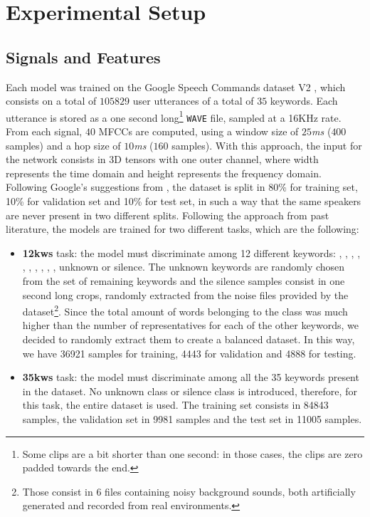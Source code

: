 \section{Experimental Setup}

\subsection{Signals and Features}
\label{sec:sig&features}


Each model was trained on the Google Speech Commands dataset V2 \cite{speechdataset2018warden}, which consists on a total of $105829$ user utterances of a total of $35$ keywords. Each utterance is stored as a one second long\footnote{Some clips are a bit shorter than one second: in those cases, the clips are zero padded towards the end.} \verb|WAVE| file, sampled at a 16KHz rate. From each signal, $40$ MFCCs are computed, using a window size of $25$\textit{ms} ($400$ samples) and a hop size of $10$\textit{ms} ($160$ samples). With this approach, the input for the network consists in 3D tensors with one outer channel, where width represents the time domain and height represents the frequency domain. Following Google's suggestions from \cite{speechdataset2018warden}, the dataset is split in 80\% for training set, 10\% for validation set and 10\% for test set, in such a way that the same speakers are never present in two different splits. 
Following the approach from past literature, the models are trained for two different tasks, which are the following:
\begin{itemize}
	\item \textbf{12kws} task: the model must discriminate among 12 different keywords: , , , , , , , , , , unknown or silence. The unknown keywords are randomly chosen from the set of remaining keywords and the silence samples consist in one second long crops, randomly extracted from the noise files provided by the dataset\footnote{Those consist in 6 files containing noisy background sounds, both artificially generated and recorded from real environments.}. Since the total amount of words belonging to the  class was much higher than the number of representatives for each of the other keywords, we decided to randomly extract them to create a balanced dataset. In this way, we have 36921 samples for training, 4443 for validation and 4888 for testing.
	\item \textbf{35kws} task: the model must discriminate among all the 35 keywords present in the dataset. No unknown class or silence class is introduced, therefore, for this task, the entire dataset is used. The training set consists in 84843 samples, the validation set in 9981 samples and the test set in 11005 samples. 
\end{itemize}


